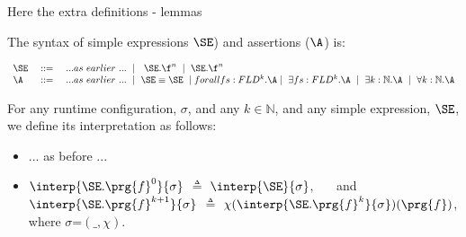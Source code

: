 Here the extra definitions - lemmas 

\begin{definition} The syntax of simple expressions $\SE$) and assertions ($\A$) is:
\label{def:assertions}

 $\begin{array}{lcl}
 \SE & ::= &   ... as\ earlier\ ... \ \mid \  \ \SE.\f^n  \ \mid \ \SE.\f^n \ \\
 \A &\ ::=\  &   ... as\ earlier\ ... \ \mid \ \SE \equiv \SE\ \mid forall fs:FLD^k.\A \mid \  \exists fs:FLD^k.\A  \ \mid \  \exists k:\mathbb{N}.\A   \ \mid \  \forall k:\mathbb{N}.\A
\end{array}$
\end{definition}

 \begin{definition}

For any runtime configuration, $\sigma$, and any $k\in \mathbb{N}$, and any simple expression, $\SE$, we define its interpretation as follows:

\begin{itemize}
     \item ... as before ...
   \item
     $\interp {\SE.\prg{f}^0}{\sigma}$ $ \triangleq$  $\interp {\SE}{\sigma}$, \ \ \ and \ \ \ $\interp {\SE.\prg{f}^{k+1}}{\sigma}$ $ \triangleq$   $\chi({\interp {\SE.\prg{f}^k}{\sigma}})(\prg{f})$, where $\sigma$=$(\_,\chi)$.
   \end{itemize}
\end{definition}


